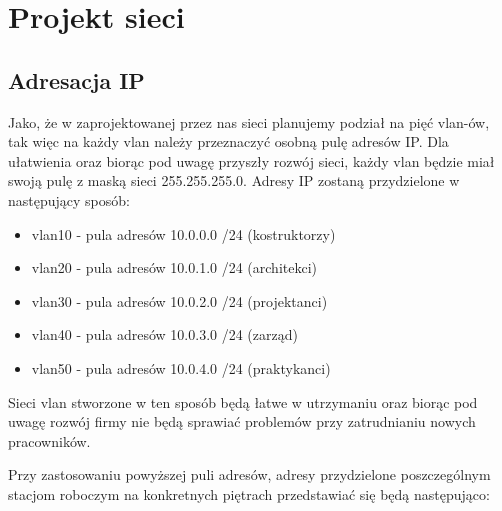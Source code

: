 \documentclass[a4paper, 12pt]{article}
\begin{document}
\section{Projekt sieci}

\subsection{Adresacja IP}
Jako, że w zaprojektowanej przez nas sieci planujemy podział na pięć vlan-ów, tak więc na każdy vlan należy przeznaczyć osobną pulę adresów IP. Dla ułatwienia oraz biorąc pod uwagę przyszły rozwój sieci, każdy vlan będzie miał swoją pulę z maską sieci 255.255.255.0. Adresy IP zostaną przydzielone w następujący sposób:

\begin{itemize}
\item vlan10 - pula adresów 10.0.0.0 /24 (kostruktorzy) 
\item vlan20 - pula adresów 10.0.1.0 /24 (architekci)
\item vlan30 - pula adresów 10.0.2.0 /24 (projektanci)
\item vlan40 - pula adresów 10.0.3.0 /24 (zarząd)
\item vlan50 - pula adresów 10.0.4.0 /24 (praktykanci)
\end{itemize}

Sieci vlan stworzone w ten sposób będą łatwe w utrzymaniu oraz biorąc pod uwagę rozwój firmy nie będą sprawiać problemów przy zatrudnianiu nowych pracowników.

Przy zastosowaniu powyższej puli adresów, adresy przydzielone poszczególnym stacjom roboczym na konkretnych piętrach przedstawiać się będą następująco:
\end{document}
